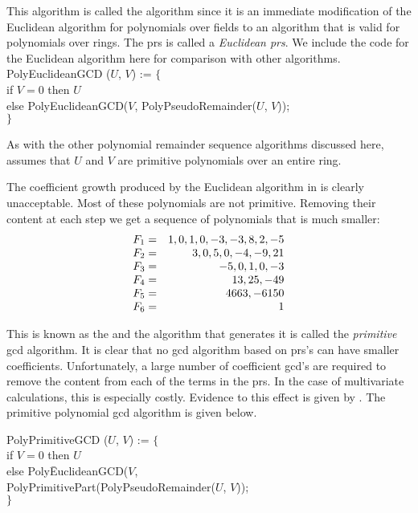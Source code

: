 This algorithm is called the  algorithm since
it is an immediate modification of the Euclidean algorithm for
polynomials over fields to an algorithm that is valid for polynomials
over rings.  The {\sc prs} is called a {\em Euclidean {\sc prs}}.  We
include the code for the Euclidean algorithm here for comparison with
other algorithms.
\begindsacode
PolyEuclideanGCD ($U$, $V$) := $\{$ \\
\> if $V=0$ then $U$ \\
\> else PolyEuclideanGCD($V$, PolyPseudoRemainder($U$, $V$)); \\
\> $\}$
\enddsacode

\noindent
As with the other polynomial remainder sequence algorithms discussed here,
 assumes that $U$ and $V$ are primitive polynomials
over an entire ring.

The coefficient growth produced by the Euclidean algorithm in
 is clearly unacceptable.  Most of these
polynomials are not primitive.  Removing their content at each step we
get a sequence of polynomials that is much smaller:
\begin{equation}
\begin{array}[15pt]{lr}
F_1=&1, 0, 1, 0, -3, -3, 8, 2, -5\\
F_2=&3, 0, 5, 0, -4, -9, 21\\
F_3=&-5, 0, 1, 0, -3\\
F_4=&13, 25, -49\\
F_5=& 4663, -6150\\
F_6=& 1
\end{array}
\label{Primitive:PRS:Eq}
\end{equation}

This is known as the  and the algorithm that
generates it is called the {\em primitive} {\sc gcd}
algorithm. It is clear that no {\sc
gcd} algorithm based on {\sc prs}'s can have smaller coefficients.
Unfortunately, a large number of coefficient {\sc gcd}'s are required
to remove the content from each of the terms in the {\sc prs}.  In the
case of multivariate calculations, this is especially costly.
Evidence to this effect is given by {\Collins}
\cite{Collins1967-sq}.  The primitive polynomial {\sc gcd} 
algorithm is given below.

\begindsacode
PolyPrimitiveGCD ($U$, $V$) := $\{$\\
\> if $V=0$ then $U$ \\
\> else Poly\=EuclideanGCD($V$, \\
\> \>        PolyPrimitivePart(PolyPseudoRemainder($U$, $V$));\\
\> $\}$
\enddsacode

